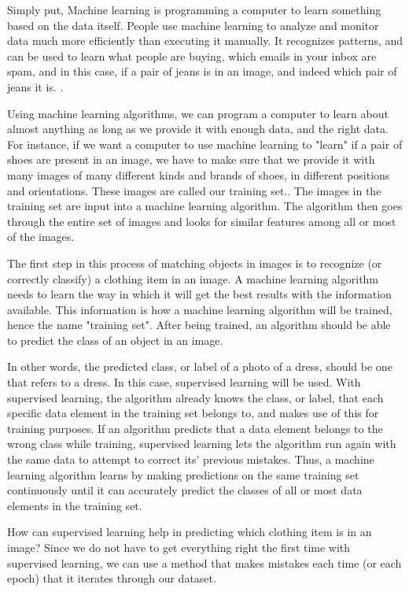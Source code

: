 \documentclass[12pt]{article} %
\begin{document}
	Simply put, Machine learning is programming a computer to learn something based on the data itself. People use machine learning to analyze and monitor data much more efficiently than executing it manually. It recognizes patterns, and can be used to learn what people are buying, which emails in your inbox are spam, and in this case, if a pair of jeans is in an image, and indeed which pair of jeans it is. \cite{aurelienMachineLearning}. 

	Using machine learning algorithms, we can program a computer to learn about almost anything as long as we provide it with enough data, and the right data. For instance, if we want a computer to use machine learning to "learn" if a pair of shoes are present in an image, we have to make sure that we provide it with many images of many different kinds and brands of shoes, in different positions and orientations. These images are called our training set.\cite{aurelienMachineLearning}. The images in the training set are input into a machine learning algorithm. The algorithm then goes through the entire set of images and looks for similar features among all or most of the images. 
	
	The first step in this process of matching objects in images is to recognize (or correctly classify) a clothing item in an image. A machine learning algorithm needs to learn the way in which it will get the best results with the information available. This information is how a machine learning algorithm will be trained, hence the name "training set". After being trained, an algorithm should be able to predict the class of an object in an image. 

	In other words, the predicted class, or label of a photo of a dress, should be one that refers to a dress. In this case, supervised learning will be used. With supervised learning, the algorithm already knows the class, or label, that each specific data element in the training set belongs to, and makes use of this for training purposes. If an algorithm predicts that a data element belongs to the wrong class while training, supervised learning lets the algorithm run again with the same data to attempt to correct its' previous mistakes\cite{aurelienMachineLearning}. Thus, a machine learning algorithm learns by making predictions on the same training set continuously until it can accurately predict the classes of all or most data elements in the training set. 
	
	How can supervised learning help in predicting which clothing item is in an image? Since we do not have to get everything right the first time with supervised learning, we can use a method that makes mistakes each time (or each epoch) that it iterates through our dataset. 
\end{document}

